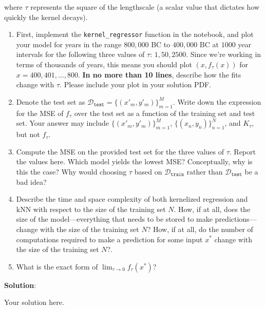 \documentclass[submit]{../harvardml}
\newenvironment{solution}{
    \vspace{2mm}
    \color{blue}\noindent\textbf{Solution}:
}{}
\begin{document}
\begin{problem}
\begin{enumerate}
where $\tau$ represents the square of the lengthscale (a scalar value that
dictates how quickly the kernel decays).  


\begin{enumerate}
    
  \item First, implement the \texttt{kernel\_regressor} function in the notebook, and plot your model for years in the range $800,000$ BC to $400,000$ BC at $1000$ year intervals for the following three values of $\tau$: $1, 50, 2500$. Since we're working in terms of thousands of years, this means you should plot $(x, f_\tau(x))$ for $x = 400, 401, \dots, 800$. \textbf{In no more than 10 lines}, describe how the fits change with $\tau$. Please include your plot in your solution PDF.

  \item Denote the test set as $\mathcal{D}_\texttt{test} = \{(x'_m, y'_m)\}_{m = 1} ^M$.  Write down the expression for the MSE of $f_\tau$ over the test set as a function of the training set and test set. Your answer may include $\{(x'_m, y'_m)\}_{m = 1} ^M$, $\{(x_n, y_n)\}_{n = 1} ^N$, and $K_\tau$, but not $f_\tau$.

    \item Compute the MSE on the provided test set for the three values of $\tau$.  Report the values here. Which model yields the lowest MSE? Conceptually, why is this the case? Why would choosing $\tau$ based on $\mathcal{D}_\texttt{train}$ rather than $\mathcal{D}_\texttt{test}$ be a bad idea? 

  \item Describe the time and space complexity of both kernelized regression and kNN with respect to the size of the training set $N$.  How, if at all, does the size of the model---everything that needs to be stored to make predictions---change with the size of the training set $N$?  How, if at all, do the number of computations required to make a prediction for some input $x^*$ change with the size of the training set $N$?.
  

  \item  What is the exact form of $\lim_{\tau \to 0 }f_\tau(x^*)$?
  \end{enumerate}
\end{enumerate}
\end{problem}

\newpage
\begin{solution}
	Your solution here.
\end{solution}
\end{document}

